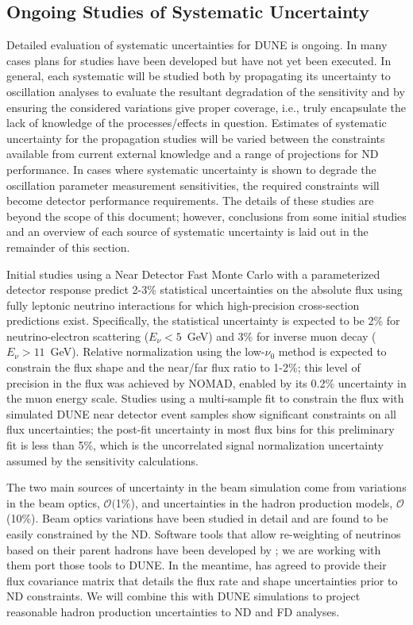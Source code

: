 \subsection{Ongoing Studies of Systematic Uncertainty}
\label{sec:syst_studies_ind}
Detailed evaluation of systematic uncertainties for DUNE is ongoing. In many cases plans for studies
have been developed but have not yet been executed. In general, each systematic will be studied both by
propagating its uncertainty to oscillation analyses to evaluate the resultant degradation of the sensitivity
and by ensuring the considered variations give proper coverage, i.e., truly encapsulate
the lack of knowledge of the processes/effects in question. Estimates of systematic uncertainty for the 
propagation studies will be varied between the constraints available from current external knowledge
and a range of projections for ND performance. In cases where systematic uncertainty is shown to
degrade the oscillation parameter
measurement sensitivities, the required constraints will become detector performance requirements.
The details of these studies are beyond the scope of this document; however, conclusions from some
initial studies and an overview of each source of systematic uncertainty is laid out in the remainder of
this section.

Initial studies using a Near Detector Fast Monte Carlo with a parameterized detector response
predict 2-3\% statistical uncertainties on the absolute flux using fully 
leptonic neutrino interactions for which high-precision cross-section predictions 
exist. Specifically,
the statistical uncertainty is expected to be 2\% for neutrino-electron
scattering ($E_\nu<5$~GeV) and 3\% for inverse muon decay ($E_\nu>11$~GeV).
Relative normalization using the low-$\nu_0$ method is
expected to constrain the flux shape and the near/far flux ratio to 1-2\%; this level of
precision in the \numu flux was achieved by NOMAD\cite{Wu:2007ab,Lyubushkin:2008pe}, enabled by its 0.2\%
uncertainty in the muon energy scale.
Studies using a multi-sample fit  to constrain the flux with simulated DUNE near detector
event samples show significant constraints on all flux
uncertainties; the post-fit uncertainty in most flux bins for this preliminary fit is less
than 5\%, which is the uncorrelated \numu signal normalization
uncertainty assumed by the sensitivity calculations. 

The two main sources of uncertainty in the beam simulation come from variations in the beam optics,
$\mathcal{O}($1\%), and uncertainties in the hadron production models, $\mathcal{O}$(10\%).
Beam optics variations have been studied in detail
and are found to be easily constrained by the ND. Software tools that
allow re-weighting of neutrinos based on their parent hadrons have been developed by \minerva; we are working with
them port those tools to DUNE. In the meantime, \minerva has agreed to provide their flux covariance matrix
that details the flux rate and shape uncertainties prior to ND constraints. We will combine this with DUNE
simulations to project reasonable hadron production uncertainties to ND and FD analyses.

